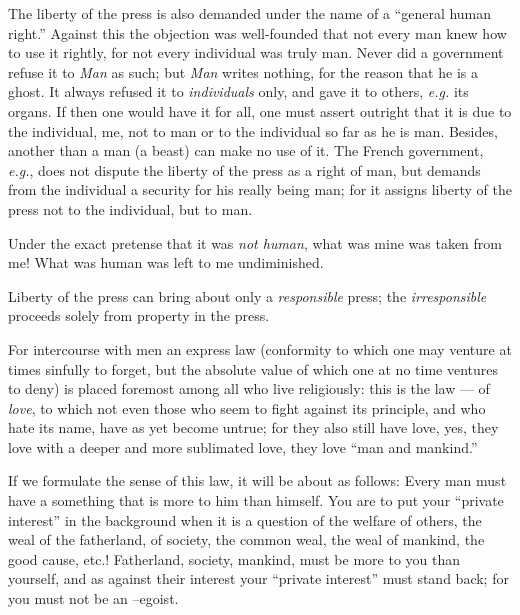 The liberty of the press is also demanded under the name of a ``general human 
right.'' Against this the objection was well-founded that not every man knew 
how to use it rightly, for not every individual was truly man. Never did a 
government refuse it to \textit{Man} as such; but \textit{Man} writes nothing, 
for the reason that he is a ghost. It always refused it to 
\textit{individuals} only, and gave it to others, \textit{e.g.} its organs. 
If then one would have it for all, one must assert outright that it is due to 
the individual, me, not to man or to the individual so far as he is man. 
Besides, another than a man (a beast) can make no use of it. The French 
government, \textit{e.g.}, does not dispute the liberty of the press as a 
right of man, but demands from the individual a security for his really being 
man; for it assigns liberty of the press not to the individual, but to man.

Under the exact pretense that it was \textit{not human}, what was mine was 
taken from me! What was human was left to me undiminished.

Liberty of the press can bring about only a \textit{responsible} press; the 
\textit{irresponsible} proceeds solely from property in the press.

\myhrule

For intercourse with men an express law (conformity to which one may venture 
at times sinfully to forget, but the absolute value of which one at no time 
ventures to deny) is placed foremost among all who live religiously: this is 
the law --- of \textit{love}, to which not even those who seem to fight against 
its principle, and who hate its name, have as yet become untrue; for they also 
still have love, yes, they love with a deeper and more sublimated love, they 
love ``man and mankind.''

If we formulate the sense of this law, it will be about as follows: Every man 
must have a something that is more to him than himself. You are to put your 
``private interest'' in the background when it is a question of the welfare 
of others, the weal of the fatherland, of society, the common weal, the weal 
of mankind, the good cause, etc.! Fatherland, society, mankind, must be more 
to you than yourself, and as against their interest your ``private 
interest'' must stand back; for you must not be an --egoist.

